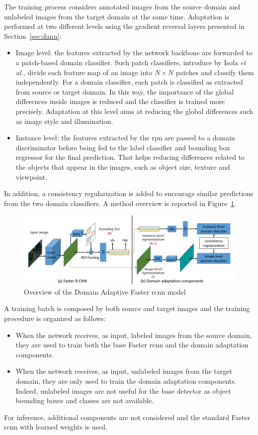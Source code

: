 \documentclass[%
    corpo=12pt,
    twoside,
    stile=classica,   
    tipotesi=magistrale,
    evenboxes,
    english,
	numerazioneromana,
]{toptesi}
\begin{document}
The training process considers annotated images from the source domain and unlabeled images from the target domain at the same time. Adaptation is performed at two different levels  using the gradient reversal layers presented in Section~\ref{sec:dann}:

\begin{itemize}
	\item Image level: the features extracted by the network backbone are forwarded to a patch-based domain classifier. Such patch classifiers, introduce by Isola \textit{et al.}\cite{isola2018imagetoimage}, divide each feature map of an image into $ N\times N $ patches and classify them independently. For a domain classifier, each patch is classified as extracted from source or target domain. In this way, the importance of the global differences inside images is reduced and the classifier is trained more precisely. Adaptation at this level aims at reducing the global differences such as image style and illumination.
	\item Instance level: the features extracted by the \gls{rpn} are passed to a domain discriminator before being fed to the label classifier and bounding box regressor for the final prediction. That helps reducing differences related to the objects that appear in the images, such as object size, texture and viewpoint.
\end{itemize}
In addition, a consistency regularization is added to encourage similar predictions from the two domain classifiers. A method overview is reported in Figure~\ref{fig:dafasterrcnn}.

\begin{figure}[ht]
	\centering
	\includegraphics[width=\linewidth]{imgs/dafasterrcnn.png}
	\caption{Overview of the Domain Adaptive Faster \gls{rcnn} model\cite{chen2018domain}}
	\label{fig:dafasterrcnn}
\end{figure}

\bigskip
A training batch is composed by both source and target images and the training procedure is organized as follows:
\begin{itemize}
	\item When the network receives, as input, labeled images from the source domain, they are used to train both the base Faster \gls{rcnn} and the domain adaptation components.
	\item When the network receives, as input, unlabeled images from the target domain, they are only used to train the domain adaptation components. Indeed, unlabeled images are not useful for the base detector as object bounding boxes and classes are not available.
\end{itemize}
For inference, additional components are not considered and the standard Faster \gls{rcnn} with learned weights is used.
\end{document}

